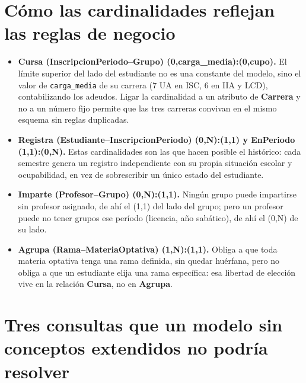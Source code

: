 \documentclass[11pt,letterpaper]{article}
\begin{document}
\section{Cómo las cardinalidades reflejan las reglas de negocio}

\begin{itemize}
  \item \textbf{Cursa (InscripcionPeriodo--Grupo) (0,carga\_media):(0,cupo).} El límite superior del lado del estudiante no es una constante del modelo, sino el valor de \texttt{carga\_media} de su carrera (7 UA en ISC, 6 en IIA y LCD), contabilizando los adeudos. Ligar la cardinalidad a un atributo de \textbf{Carrera} y no a un número fijo permite que las tres carreras convivan en el mismo esquema sin reglas duplicadas.
  \item \textbf{Registra (Estudiante--InscripcionPeriodo) (0,N):(1,1) y EnPeriodo (1,1):(0,N).} Estas cardinalidades son las que hacen posible el histórico: cada semestre genera un registro independiente con su propia situación escolar y ocupabilidad, en vez de sobrescribir un único estado del estudiante.
  \item \textbf{Imparte (Profesor--Grupo) (0,N):(1,1).} Ningún grupo puede impartirse sin profesor asignado, de ahí el (1,1) del lado del grupo; pero un profesor puede no tener grupos ese período (licencia, año sabático), de ahí el (0,N) de su lado.
  \item \textbf{Agrupa (Rama--MateriaOptativa) (1,N):(1,1).} Obliga a que toda materia optativa tenga una rama definida, sin quedar huérfana, pero no obliga a que un estudiante elija una rama específica: esa libertad de elección vive en la relación \textbf{Cursa}, no en \textbf{Agrupa}.
\end{itemize}

\section{Tres consultas que un modelo sin conceptos extendidos no podría resolver}
\end{document}

